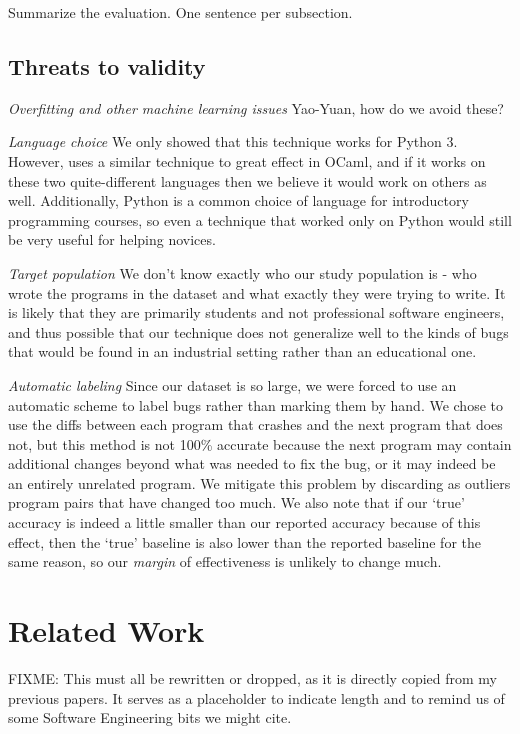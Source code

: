 \documentclass[conference]{IEEEtran}
\begin{document}
Summarize the evaluation. One sentence per subsection.

\subsection{Threats to validity}

\emph{Overfitting and other machine learning issues} Yao-Yuan, how do we avoid
these?

\emph{Language choice} We only showed that this technique works for Python 3.
However, \cite{learning-to-blame} uses a similar technique to great effect in
OCaml, and if it works on these two quite-different languages then we believe
it would work on others as well. Additionally, Python is a common choice of
language for introductory programming courses, so even a technique that worked
only on Python would still be very useful for helping novices.

\emph{Target population} We don't know exactly who our study population is -
who wrote the programs in the dataset and what exactly they were trying to write.
It is likely that they are primarily students and not professional software engineers,
and thus possible that our technique does not generalize well to the kinds of
bugs that would be found in an industrial setting rather than an educational one.

\emph{Automatic labeling} Since our dataset is so large, we were forced to use an automatic
scheme to label bugs rather than marking them by hand. We chose to use the diffs
between each program that crashes and the next program that does not, but this method
is not 100\% accurate because the next program may contain additional changes
beyond what was needed to fix the bug, or it may indeed be an entirely unrelated
program. We mitigate this problem by discarding as outliers program pairs that have
changed too much. We also note that if our `true' accuracy is indeed a little
smaller than our reported accuracy because of this effect, then the `true' baseline
is also lower than the reported baseline for the same reason, so our
\emph{margin} of effectiveness is unlikely to change much.

\section{Related Work}
FIXME: This must all be rewritten or dropped, as it is directly copied from
my previous papers. It serves as a placeholder to indicate length and to
remind us of some Software Engineering bits we might cite.
\end{document}
